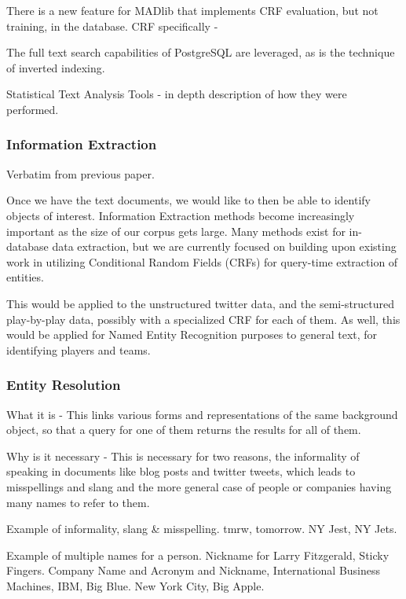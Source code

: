 \documentclass{article}
\begin{document}
\begin{enumerate}
  There is a new feature for MADlib that implements CRF evaluation, but not training, in the database.
  CRF specifically -

  The full text search capabilities of PostgreSQL are leveraged,
  as is the technique of inverted indexing.


  Statistical Text Analysis Tools - in depth description of how they were performed.

    \subsubsection{Information Extraction}

    Verbatim from previous paper.

    Once we have the text documents, we would like to then be able to identify
    objects of interest. Information Extraction methods become increasingly
    important as the size of our corpus gets large. Many methods exist for in-database data
    extraction, but we are currently focused on building upon existing work in
    utilizing Conditional Random Fields (CRFs) for query-time extraction of
    entities.

    This would be applied to the unstructured twitter data,
    and the semi-structured play-by-play data,
    possibly with a specialized CRF for each of them.
    As well, this would be applied for Named Entity Recognition purposes to general text, for identifying players and teams.


    \subsubsection{Entity Resolution}
    \label{sec:SCER}

    What it is -
    This links various forms and representations of the same background object,
    so that a query for one of them returns the results for all of them.

    Why is it necessary -
    This is necessary for two reasons,
    the informality of speaking in documents like blog posts and twitter tweets,
    which leads to misspellings and slang
    and the more  general case of people or companies having many names to refer to them.

    Example of informality, slang \& misspelling. tmrw, tomorrow. NY Jest, NY Jets.

    Example of multiple names for a person.
    Nickname for Larry Fitzgerald, Sticky Fingers.
    Company Name and Acronym and Nickname, International Business Machines, IBM, Big Blue.
    New York City, Big Apple.


\end{enumerate}
\end{document}
